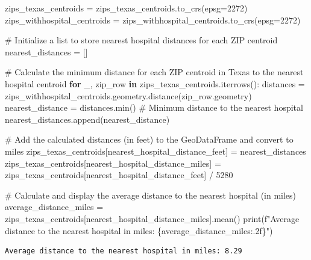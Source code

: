 \documentclass[
  letterpaper,
  DIV=11,
  numbers=noendperiod]{scrartcl}
\newenvironment{Shaded}{\begin{snugshade}}{\end{snugshade}}
\newcommand{\BuiltInTok}[1]{\textcolor[rgb]{0.00,0.23,0.31}{#1}}
\newcommand{\CommentTok}[1]{\textcolor[rgb]{0.37,0.37,0.37}{#1}}
\newcommand{\ControlFlowTok}[1]{\textcolor[rgb]{0.00,0.23,0.31}{\textbf{#1}}}
\newcommand{\DecValTok}[1]{\textcolor[rgb]{0.68,0.00,0.00}{#1}}
\newcommand{\KeywordTok}[1]{\textcolor[rgb]{0.00,0.23,0.31}{\textbf{#1}}}
\newcommand{\NormalTok}[1]{\textcolor[rgb]{0.00,0.23,0.31}{#1}}
\newcommand{\OperatorTok}[1]{\textcolor[rgb]{0.37,0.37,0.37}{#1}}
\newcommand{\SpecialCharTok}[1]{\textcolor[rgb]{0.37,0.37,0.37}{#1}}
\newcommand{\SpecialStringTok}[1]{\textcolor[rgb]{0.13,0.47,0.30}{#1}}
\newcommand{\StringTok}[1]{\textcolor[rgb]{0.13,0.47,0.30}{#1}}
\begin{document}
\begin{Shaded}
\begin{Highlighting}[]
\NormalTok{zips\_texas\_centroids }\OperatorTok{=}\NormalTok{ zips\_texas\_centroids.to\_crs(epsg}\OperatorTok{=}\DecValTok{2272}\NormalTok{)}
\NormalTok{zips\_withhospital\_centroids }\OperatorTok{=}\NormalTok{ zips\_withhospital\_centroids.to\_crs(epsg}\OperatorTok{=}\DecValTok{2272}\NormalTok{)}

\CommentTok{\# Initialize a list to store nearest hospital distances for each ZIP centroid}
\NormalTok{nearest\_distances }\OperatorTok{=}\NormalTok{ []}

\CommentTok{\# Calculate the minimum distance for each ZIP centroid in Texas to the nearest hospital centroid}
\ControlFlowTok{for}\NormalTok{ \_, zip\_row }\KeywordTok{in}\NormalTok{ zips\_texas\_centroids.iterrows():}
\NormalTok{    distances }\OperatorTok{=}\NormalTok{ zips\_withhospital\_centroids.geometry.distance(zip\_row.geometry)}
\NormalTok{    nearest\_distance }\OperatorTok{=}\NormalTok{ distances.}\BuiltInTok{min}\NormalTok{()  }\CommentTok{\# Minimum distance to the nearest hospital}
\NormalTok{    nearest\_distances.append(nearest\_distance)}

\CommentTok{\# Add the calculated distances (in feet) to the GeoDataFrame and convert to miles}
\NormalTok{zips\_texas\_centroids[}\StringTok{\textquotesingle{}nearest\_hospital\_distance\_feet\textquotesingle{}}\NormalTok{] }\OperatorTok{=}\NormalTok{ nearest\_distances}
\NormalTok{zips\_texas\_centroids[}\StringTok{\textquotesingle{}nearest\_hospital\_distance\_miles\textquotesingle{}}\NormalTok{] }\OperatorTok{=}\NormalTok{ zips\_texas\_centroids[}\StringTok{\textquotesingle{}nearest\_hospital\_distance\_feet\textquotesingle{}}\NormalTok{] }\OperatorTok{/} \DecValTok{5280}

\CommentTok{\# Calculate and display the average distance to the nearest hospital (in miles)}
\NormalTok{average\_distance\_miles }\OperatorTok{=}\NormalTok{ zips\_texas\_centroids[}\StringTok{\textquotesingle{}nearest\_hospital\_distance\_miles\textquotesingle{}}\NormalTok{].mean()}
\BuiltInTok{print}\NormalTok{(}\SpecialStringTok{f"Average distance to the nearest hospital in miles: }\SpecialCharTok{\{}\NormalTok{average\_distance\_miles}\SpecialCharTok{:.2f\}}\SpecialStringTok{"}\NormalTok{)}
\end{Highlighting}
\end{Shaded}

\begin{verbatim}
Average distance to the nearest hospital in miles: 8.29
\end{verbatim}
\end{document}
